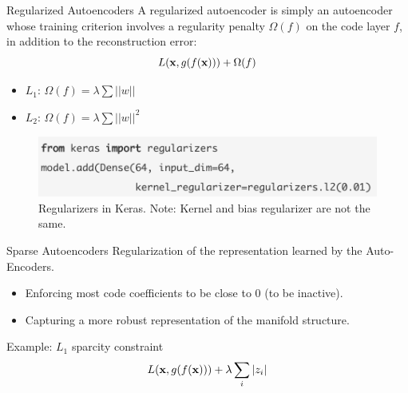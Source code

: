\documentclass[xcolor=pdftex,dvipsnames,table,mathserif]{beamer}
\begin{document}
\begin{frame}{Regularized Autoencoders}
A regularized autoencoder is simply an autoencoder whose training criterion involves a
regularity penalty $\Omega(f)$ on the code layer $f$, in addition to the reconstruction error:
\begin{equation}
L ( \mathbf{x} , g(f(\mathbf{x})))+\Omega(f)
\end{equation}
\begin{itemize}
\item $L_1$:  $ \Omega(f) = \lambda \sum ||w||$
\item $L_2$:  $ \Omega(f) = \lambda \sum ||w||^2$
\end{itemize}
\begin{figure}
\includegraphics[width=\columnwidth]{../graphics/regularizers}
\caption{Regularizers in Keras. Note: Kernel and bias regularizer are not the same.}
\end{figure}
\end{frame}

\begin{frame}{Sparse Autoencoders}
Regularization of the representation learned by the Auto-Encoders.
\begin{itemize}
\item Enforcing most code coefficients to be close to 0 (to be inactive).
\item Capturing a more robust representation of the manifold structure.
\end{itemize}

\begin{block}{Example: $L_1$ sparcity constraint}
  \[
  L( \mathbf{x} , g(f(\mathbf{x}))) + \lambda \sum_i |z_i|
  \]
\end{block}

\end{frame}


\end{document}
